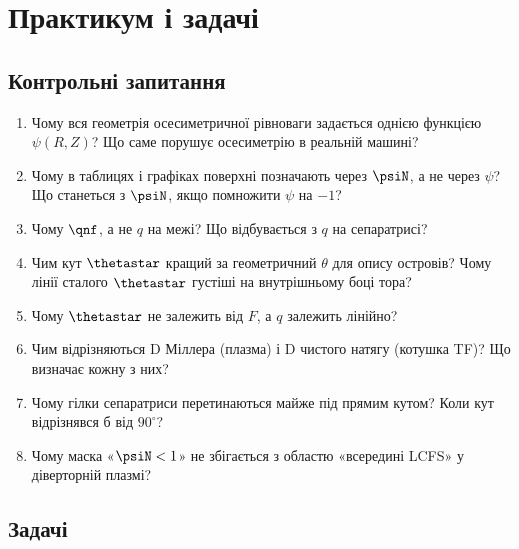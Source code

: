 \chapter{Практикум і задачі}\label{ch:geo7}

\section{Контрольні запитання}\label{sec:geo7-q}

\begin{enumerate}
\item Чому вся геометрія осесиметричної рівноваги задається однією функцією $\psi(R,Z)$? Що саме порушує осесиметрію в реальній машині?
\item Чому в таблицях і графіках поверхні позначають через $\psiN$, а не через $\psi$? Що станеться з $\psiN$, якщо помножити $\psi$ на $-1$?
\item Чому $\qnf$, а не $q$ на межі? Що відбувається з $q$ на сепаратрисі?
\item Чим кут $\thetastar$ кращий за геометричний $\theta$ для опису островів? Чому лінії сталого $\thetastar$ густіші на внутрішньому боці тора?
\item Чому $\thetastar$ не залежить від $F$, а $q$ залежить лінійно?
\item Чим відрізняються D Міллера (плазма) і D чистого натягу (котушка TF)? Що визначає кожну з них?
\item Чому гілки сепаратриси перетинаються майже під прямим кутом? Коли кут відрізнявся б від $90^\circ$?
\item Чому маска «$\psiN<1$» не збігається з областю «всередині LCFS» у діверторній плазмі?
\end{enumerate}

\section{Задачі}\label{sec:geo7-p}


